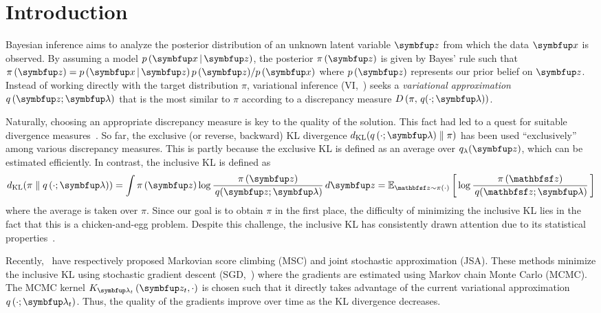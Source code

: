 
\section{Introduction}\label{section:intro}
Bayesian inference aims to analyze the posterior distribution of an unknown latent variable \(\vz\) from which the data \(\vx\) is observed.
By assuming a model \(p\,(\vx\,|\,\vz)\), the posterior \(\pi\,(\vz)\) is given by Bayes' rule such that \(\pi\,(\vz) = {p\,(\vx\,|\,\vz)\,p\,(\vz)}/{p\,(\vx)}\) where \(p\,(\vz)\) represents our prior belief on \(\vz\).
Instead of working directly with the target distribution \(\pi\), variational inference (VI,~\citealt{blei_variational_2017}) seeks a \textit{variational approximation} \(q\,(\vz; \vlambda)\) that is the most similar to \(\pi\) according to a discrepancy measure \(D\,(\pi,\, q(\cdot; \vlambda))\).

Naturally, choosing an appropriate discrepancy measure is key to the quality of the solution.
This fact had led to a quest for suitable divergence measures~\citep{pmlr-v37-salimans15, NIPS2016_7750ca35, NIPS2017_35464c84, NEURIPS2018_1cd138d0, pmlr-v97-ruiz19a}.
So far, the exclusive (or reverse, backward)  KL divergence \(\DKL{q\left(\cdot; \vlambda\right)}{\pi}\) has been used ``exclusively'' among various discrepancy measures.
This is partly because the exclusive KL is defined as an average over \(q_{\lambda}(\vz)\), which can be estimated efficiently.
In contrast, the inclusive KL is defined as
%
{%
\vspace{-0.05in}
\begin{align*}
  \DKL{\pi}{q\left(\cdot; \vlambda\right)}
  = \int \pi\,(\vz) \log \frac{\pi\left(\vz\right)}{\,q(\vz; \vlambda)} \,d\vz
  = \Esub{\rvvz \sim \pi\left(\cdot\right)}{\log \frac{\pi\left(\rvvz\right)}{\,q(\rvvz; \vlambda)} } %
\end{align*}
}%
%
where the average is taken over \(\pi\).
Since our goal is to obtain \(\pi\) in the first place, the difficulty of minimizing the inclusive KL lies in the fact that this is a chicken-and-egg problem.
Despite this challenge, the inclusive KL has consistently drawn attention due to its statistical properties~\citep{minka2005divergence, mackay_local_2001}.

Recently,~\citet{NEURIPS2020_b2070693,pmlr-v124-ou20a} have respectively proposed Markovian score climbing (MSC) and joint stochastic approximation (JSA).
These methods minimize the inclusive KL using stochastic gradient descent (SGD,~\citealt{robbins_stochastic_1951}) where the gradients are estimated using Markov chain Monte Carlo (MCMC).
The MCMC kernel \(K_{\vlambda_t}\left(\vz_t, \cdot\right)\) is chosen such that it directly takes advantage of the current variational approximation \(q\left(\cdot; \vlambda_t\right)\).
Thus, the quality of the gradients improve over time as the KL divergence decreases.

